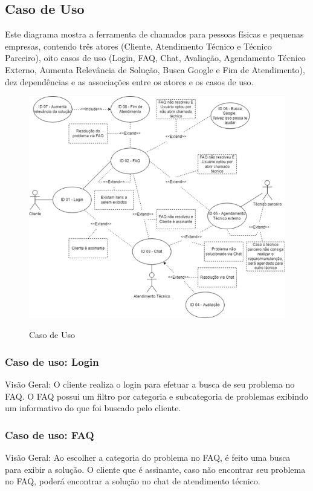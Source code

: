 \documentclass[
    12pt,               %
    openright,          %
    oneside,
    a4paper,            %
    MODELO,             %
    english,            %
    brazil              %
   ]{ifsp-spo-inf-ctds}
\begin{document}
\subsection{Caso de Uso}
Este diagrama mostra a ferramenta de chamados para pessoas físicas e pequenas empresas, contendo três atores (Cliente, Atendimento Técnico e Técnico Parceiro), oito casos de uso (Login, FAQ, Chat, Avaliação, Agendamento Técnico Externo, Aumenta Relevância de Solução, Busca Google e Fim de Atendimento), dez dependências e as associações entre os atores e os casos de uso.

\begin{figure}[h]
\caption{Caso de Uso}
\centering 
\includegraphics[c]{LaTeX/metaversoIFSP/anexos/caso de uso.png} 
    \label{figura:caso de uso}
\end{figure}

\subsubsection{Caso de uso: Login}
Visão Geral: O cliente realiza o login para efetuar a busca de seu problema no FAQ. O FAQ possui um filtro por categoria e subcategoria de problemas exibindo um informativo do que foi buscado pelo cliente. 

\subsubsection{Caso de uso: FAQ}
Visão Geral: Ao escolher a categoria do problema no FAQ, é feito uma busca para exibir a solução. O cliente que é assinante, caso não encontrar seu problema no FAQ, poderá encontrar a solução no chat de atendimento técnico.
\end{document}
